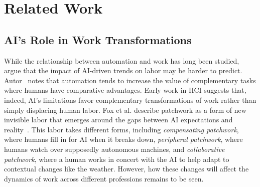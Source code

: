 \section{Related Work}


\subsection{AI's Role in Work Transformations}

While the relationship between automation and work has long been studied,
\cite{frank2019toward} argue that the impact of AI-driven trends on labor may be harder to predict.
Autor~\cite{autor2015there} notes that automation tends to increase the value of complementary tasks where humans have comparative advantages.
Early work in HCI suggests that, indeed, AI's limitations favor complementary transformations of work rather than simply displacing human labor. Fox et al. describe patchwork as a form of new invisible labor that emerges around the gaps between AI expectations and reality~\cite{fox2023patchwork}. This labor takes different forms, including \textit{compensating patchwork}, where humans fill in for AI when it breaks down, \textit{peripheral patchwork}, where humans watch over supposedly autonomous machines, and \textit{collaborative patchwork}, where a human works in concert with the AI to help adapt to contextual changes like the weather. However, how these changes will affect the dynamics of work across different professions remains to be seen.

